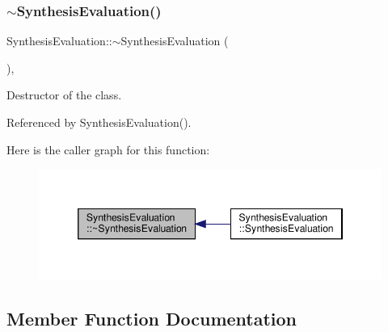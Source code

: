 \subsubsection{\texorpdfstring{$\sim$\+Synthesis\+Evaluation()}{~SynthesisEvaluation()}}
{\footnotesize\ttfamily Synthesis\+Evaluation\+::$\sim$\+Synthesis\+Evaluation (\begin{DoxyParamCaption}{ }\end{DoxyParamCaption})\hspace{0.3cm}{\ttfamily [override]}, {\ttfamily [default]}}



Destructor of the class. 



Referenced by Synthesis\+Evaluation().

Here is the caller graph for this function\+:
\nopagebreak
\begin{figure}[H]
\begin{center}
\leavevmode
\includegraphics[width=346pt]{d6/d46/classSynthesisEvaluation_a27beacf8d148b14fa4508a6e701a34fd_icgraph}
\end{center}
\end{figure}


\subsection{Member Function Documentation}
\mbox{\label{classSynthesisEvaluation_a9507d25cab85fcb8631f712637b4707b}} 
